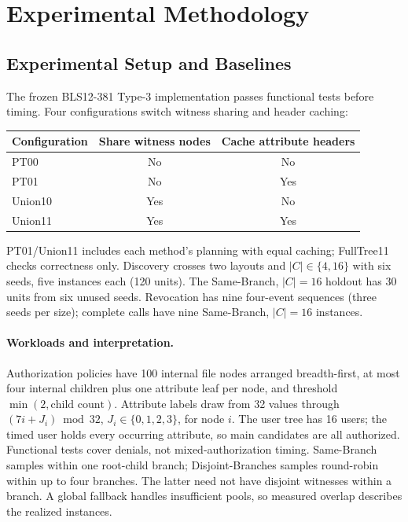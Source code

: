 \documentclass[runningheads]{llncs}
\newif\ifmarkrevisions
\newenvironment{revision}{\par\begingroup\ifmarkrevisions\color{RevisionBlue}\fi}{\par\endgroup}
\begin{document}
\section{Experimental Methodology}
\begin{revision}
\subsection{Experimental Setup and Baselines}
The frozen BLS12-381 Type-3 implementation passes functional tests before
timing. Four configurations switch witness sharing and header caching:
\begin{center}
\begin{tabular}{lcc}\toprule
Configuration & Share witness nodes & Cache attribute headers\\\midrule
PT00 & No & No\\ PT01 & No & Yes\\
Union10 & Yes & No\\ Union11 & Yes & Yes\\\bottomrule
\end{tabular}
\end{center}
PT01/Union11 includes each method's planning with equal caching; FullTree11
checks correctness only. Discovery crosses two layouts and $|C|\in\{4,16\}$
with six seeds, five instances each (120 units). The Same-Branch, $|C|=16$
holdout has 30 units from six unused seeds. Revocation has nine four-event
sequences (three seeds per size); complete calls have nine Same-Branch,
$|C|=16$ instances.

\paragraph{Workloads and interpretation.}
Authorization policies have 100 internal file nodes arranged breadth-first,
at most four internal children plus one attribute leaf per node, and threshold
$\min(2,\text{child count})$. Attribute labels draw from 32 values through
$(7i+J_i)\bmod32$, $J_i\in\{0,1,2,3\}$, for node $i$. The user tree has 16
users; the timed user holds every occurring attribute, so main candidates are
all authorized. Functional tests cover denials, not mixed-authorization timing.
Same-Branch samples within one root-child branch; Disjoint-Branches samples
round-robin within up to four branches. The latter need not have disjoint
witnesses within a branch. A global fallback handles insufficient pools,
so measured overlap describes the realized instances.


\end{revision}
\end{document}

